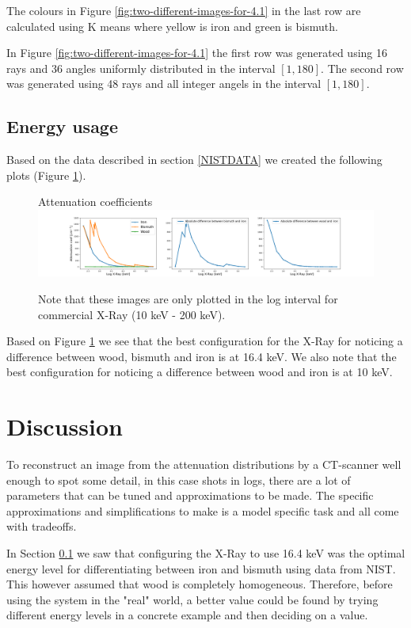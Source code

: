 \documentclass{article}
\begin{document}
The colours in Figure \ref{fig:two-different-images-for-4.1} in the last row are calculated using K means where yellow is iron and green is bismuth. 

In Figure \ref{fig:two-different-images-for-4.1} the first row was generated using 16 rays and 36 angles uniformly distributed in the interval $[1,180]$. The second row was generated using 48 rays and all integer angels in the interval $[1, 180]$. 

\subsection{Energy usage}\label{sec:energy-usage}
Based on the data described in section \ref{NISTDATA} we created the following plots (Figure \ref{fig:both-attenuation-coeff-plots}).
\begin{figure}[H]
    \centering
    \large{Attenuation coefficients} \\
    \includegraphics[scale=0.3]{images/combined-plot-attenuation.png}
    \caption{\small Note that these images are only plotted in the log interval for commercial X-Ray (10 keV - 200 keV).}
    \label{fig:both-attenuation-coeff-plots}
\end{figure} 

\noindent Based on Figure \ref{fig:both-attenuation-coeff-plots} we see that the best configuration for the X-Ray for noticing a difference between wood, bismuth and iron is at 16.4 keV. We also note that the best configuration for noticing a difference between wood and iron is at 10 keV.  

\section{Discussion}
To reconstruct an image from the attenuation distributions by a CT-scanner well enough to spot some detail, in this case shots in logs, there are a lot of parameters that can be tuned and approximations to be made. The specific approximations and simplifications to make is a model specific task and all come with tradeoffs. 

In Section \ref{sec:energy-usage} we saw that configuring the X-Ray to use 16.4 keV was the optimal energy level for differentiating between iron and bismuth using data from NIST. This however assumed that wood is completely homogeneous. Therefore, before using the system in the "real" world, a better value could be found by trying different energy levels in a concrete example and then deciding on a value.
\end{document}
